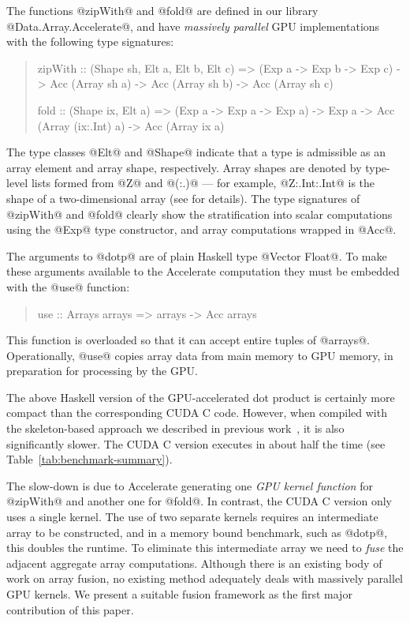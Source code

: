 The functions @zipWith@ and @fold@ are defined in our library @Data.Array.Accelerate@, and have \emph{massively parallel} GPU implementations with the following type signatures:
%
\begin{quote}
\begin{code}
zipWith :: (Shape sh, Elt a, Elt b, Elt c)
        => (Exp a -> Exp b -> Exp c)
        -> Acc (Array sh a) 
        -> Acc (Array sh b) 
        -> Acc (Array sh c)

fold    :: (Shape ix, Elt a)
        => (Exp a -> Exp a -> Exp a)
        -> Exp a
        -> Acc (Array (ix:.Int) a)
        -> Acc (Array ix a)
\end{code}
\end{quote}
%
The type classes @Elt@ and @Shape@ indicate that a type is admissible as an array element and array shape, respectively. Array shapes are denoted by type-level lists formed from @Z@ and @(:.)@ --- for example, @Z:.Int:.Int@ is the shape of a two-dimensional array (see \cite{Keller:Repa,Chakravarty:Accelerate} for details). The type signatures of @zipWith@ and @fold@ clearly show the stratification into scalar computations using the @Exp@ type constructor, and array computations wrapped in @Acc@.

The arguments to @dotp@ are of plain Haskell type @Vector Float@. To make these arguments available to the Accelerate computation they must be embedded with the @use@ function:
%
\begin{quote}
\begin{code}
use :: Arrays arrays => arrays -> Acc arrays
\end{code}
\end{quote}
%
This function is overloaded so that it can accept entire tuples of @arrays@. Operationally, @use@ copies array data from main memory to GPU memory, in preparation for processing by the GPU.

The above Haskell version of the GPU-accelerated dot product is certainly more compact than the corresponding CUDA C code. However, when compiled with the skeleton-based approach we described in previous work~\cite{Chakravarty:Accelerate}, it is also significantly slower. The CUDA C version executes in about half the time (see Table~\ref{tab:benchmark-summary}).

The slow-down is due to Accelerate generating one \emph{GPU kernel function} for @zipWith@ and another one for @fold@. In contrast, the CUDA C version only uses a single kernel. The use of two separate kernels requires an intermediate array to be constructed, and in a memory bound benchmark, such as @dotp@, this doubles the runtime. To eliminate this intermediate array we need to \emph{fuse} the adjacent aggregate array computations. Although there is an existing body of work on array fusion, no existing method adequately deals with massively parallel GPU kernels. We present a suitable fusion framework as the first major contribution of this paper.



